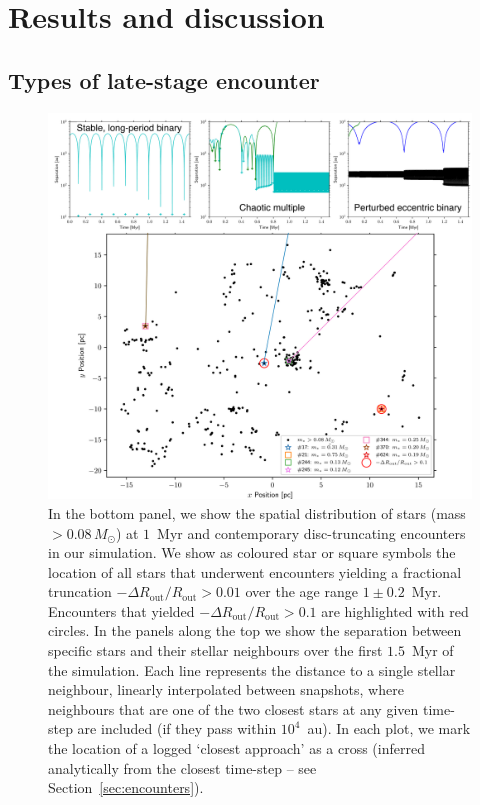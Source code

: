 \documentclass{aa}
\begin{document}
\section{Results and discussion}
\label{sec:results}

\subsection{Types of late-stage encounter}

\begin{figure}
    \centering
    \includegraphics[width=\textwidth]{Figures/encounter_spatial.pdf}
    \caption{In the bottom panel, we show the spatial distribution of stars (mass $>0.08\, M_\odot$) at $1$~Myr and contemporary disc-truncating encounters in our simulation. We show as coloured star {or square} symbols the location of all stars that underwent encounters yielding a fractional truncation $-\Delta R_\mathrm{out}/R_\mathrm{out} > 0.01$ over the age range $1\pm 0.2$~Myr. Encounters that yielded $-\Delta R_\mathrm{out}/R_\mathrm{out} > 0.1$ are highlighted with red circles. In the panels along the top we show the separation between specific stars and their stellar neighbours over the first $1.5$~Myr of the simulation. {Each line represents the distance to a single stellar neighbour, linearly interpolated between snapshots, where neighbours that are one of the two closest stars at any given time-step are included (if they pass within $10^4$~au).} In each plot, we mark the location of a logged `closest approach' as a cross (inferred analytically from the closest time-step -- see Section~\ref{sec:encounters}). }
    \label{fig:encounter_spatial}
\end{figure}
\end{document}
